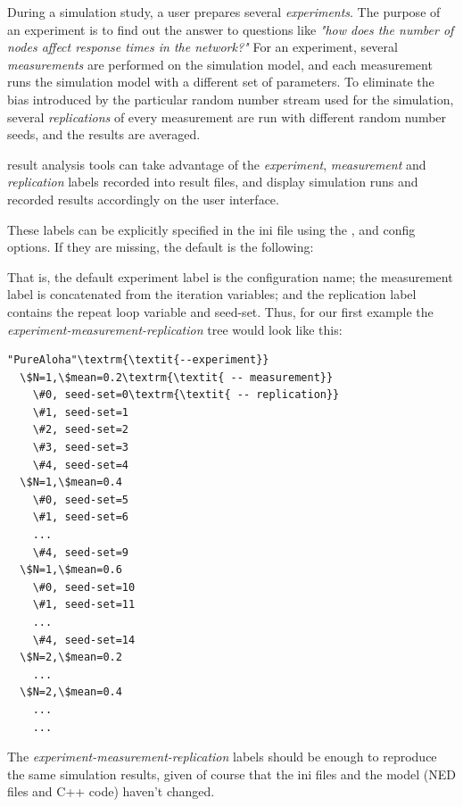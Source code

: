 During a simulation study, a user prepares several
\textit{experiments}. The purpose of an experiment is to find out the
answer to questions like \textit{"how does the number of
nodes affect response times in the network?"} For an
experiment, several \textit{measurements} are performed on the
simulation model, and each measurement runs the simulation model with a
different set of parameters. To eliminate the bias introduced by the
particular random number stream used for the simulation, several
\textit{replications} of every measurement are run with different
random number seeds, and the results are averaged.

{\opp} result analysis tools can take advantage of the \textit{experiment},
\textit{measurement} and \textit{replication} labels recorded into result
files, and display simulation runs and recorded results accordingly on
the user interface.

These labels can be explicitly specified in the ini file using the
,  and 
config options. If they are missing, the default is the following:


That is, the default experiment label is the configuration name; the
measurement label is concatenated from the iteration variables; and the
replication label contains the repeat loop variable and seed-set.
Thus, for our first example the \textit{experiment-measurement-replication}
tree would look like this:

\begin{Verbatim}[commandchars=\\\{\}]
"PureAloha"\textrm{\textit{--experiment}}
  \$N=1,\$mean=0.2\textrm{\textit{ -- measurement}}
    \#0, seed-set=0\textrm{\textit{ -- replication}}
    \#1, seed-set=1
    \#2, seed-set=2
    \#3, seed-set=3
    \#4, seed-set=4
  \$N=1,\$mean=0.4
    \#0, seed-set=5
    \#1, seed-set=6
    ...
    \#4, seed-set=9
  \$N=1,\$mean=0.6
    \#0, seed-set=10
    \#1, seed-set=11
    ...
    \#4, seed-set=14
  \$N=2,\$mean=0.2
    ...
  \$N=2,\$mean=0.4
    ...
    ...
\end{Verbatim}

The \textit{experiment-measurement-replication} labels should be enough to
reproduce the same simulation results, given of course that the ini
files and the model (NED files and C++ code) haven't changed.

